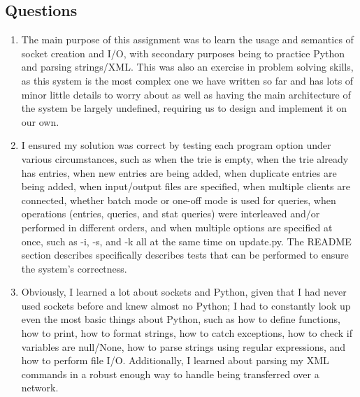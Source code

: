 \documentclass[letterpaper,10pt,fleqn]{article}
\numberwithin{equation}{section}
\begin{document}
\subsection*{Questions}
\begin{enumerate}
    \item The main purpose of this assignment was to learn the usage and semantics of socket creation and I/O, with secondary purposes being to practice Python and parsing strings/XML.  This was also an exercise in problem solving skills, as this system is the most complex one we have written so far and has lots of minor little details to worry about as well as having the main architecture of the system be largely undefined, requiring us to design and implement it on our own.
    \item I ensured my solution was correct by testing each program option under various circumstances, such as when the trie is empty, when the trie already has entries, when new entries are being added, when duplicate entries are being added, when input/output files are specified, when multiple clients are connected, whether batch mode or one-off mode is used for queries, when operations (entries, queries, and stat queries) were interleaved and/or performed in different orders, and when multiple options are specified at once, such as -i, -s, and -k all at the same time on update.py.  The README section describes specifically describes tests that can be performed to ensure the system's correctness.
    \item Obviously, I learned a lot about sockets and Python, given that I had never used sockets before and knew almost no Python; I had to constantly look up even the most basic things about Python, such as how to define functions, how to print, how to format strings, how to catch exceptions, how to check if variables are null/None, how to parse strings using regular expressions, and how to perform file I/O.  Additionally, I learned about parsing my XML commands in a robust enough way to handle being transferred over a network.
\end{enumerate}
\end{document}
